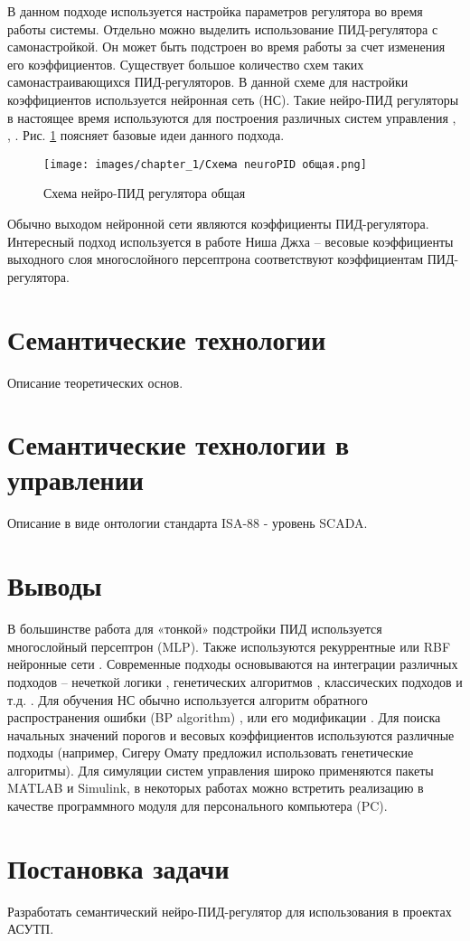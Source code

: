 В данном подходе используется настройка параметров регулятора во время работы системы. Отдельно можно выделить использование ПИД-регулятора с самонастройкой. Он может быть подстроен во время работы за счет изменения его коэффициентов. Существует большое количество схем таких самонастраивающихся ПИД-регуляторов. В данной схеме для настройки коэффициентов  используется нейронная сеть (НС).
Такие нейро-ПИД регуляторы в настоящее время используются для построения различных систем управления \cite{Omatu_Khalid_Yusof}, \cite{Omatu1997}, \cite{Omatu2010}. Рис. \ref{fig:neuro_PID_control} поясняет базовые идеи данного подхода.

\begin{figure}[H]
    \centering
    \texttt{[image: images/chapter\_1/Схема neuroPID общая.png]}
    \caption{Схема нейро-ПИД регулятора общая}
    \label{fig:neuro_PID_control}
\end{figure}

Обычно выходом нейронной сети являются коэффициенты ПИД-регулятора. Интересный подход используется в работе Ниша Джха \cite{Nisha2011} – весовые коэффициенты выходного слоя многослойного персептрона соответствуют коэффициентам ПИД-регулятора.

\section{Семантические технологии}

Описание теоретических основ.

\section{Семантические технологии в управлении}

Описание в виде онтологии стандарта ISA-88 - уровень SCADA.

\section{Выводы}

В большинстве работа для «тонкой» подстройки ПИД используется многослойный персептрон (MLP). Также используются рекуррентные или RBF нейронные сети \cite{Reza2011}. Современные подходы основываются на интеграции различных подходов – нечеткой логики \cite{Tahour2007}, генетических алгоритмов \cite{Sharkawy2006}, классических подходов и т.д. \cite{Omatu_Khalid_Yusof}.
Для обучения НС обычно используется алгоритм обратного распространения ошибки (BP algorithm) \cite{Omatu_Khalid_Yusof}, \cite{Ruano1992ApplicationsON} или его модификации \cite{Han1999}. Для поиска начальных значений порогов и весовых коэффициентов используются различные подходы (например, Сигеру Омату \cite{Omatu_Khalid_Yusof} предложил использовать генетические алгоритмы). Для симуляции систем управления широко применяются пакеты MATLAB и Simulink, в некоторых работах можно встретить реализацию в качестве программного модуля для персонального компьютера (PC).

\section{Постановка задачи}

Разработать семантический нейро-ПИД-регулятор для использования в проектах АСУТП.
